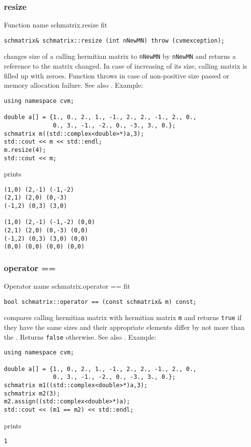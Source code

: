 \subsubsection{resize}
Function%
\pdfdest name {schmatrix.resize} fit
\begin{verbatim}
schmatrix& schmatrix::resize (int nNewMN) throw (cvmexception);
\end{verbatim}
changes  size of a calling hermitian matrix to \verb"nNewMN" by \verb"nNewMN"
and returns a reference to
the matrix changed. In case of increasing of its size, calling matrix
is filled up with zeroes. 
Function throws  
in case of non-positive size passed or memory allocation failure.
See also 
.
Example:
\begin{Verbatim}
using namespace cvm;

double a[] = {1., 0., 2., 1., -1., 2., 2., -1., 2., 0.,
              0., 3., -1., -2., 0., -3., 3., 0.};
schmatrix m((std::complex<double>*)a,3);
std::cout << m << std::endl;
m.resize(4);
std::cout << m;
\end{Verbatim}
prints
\begin{Verbatim}
(1,0) (2,-1) (-1,-2)
(2,1) (2,0) (0,-3)
(-1,2) (0,3) (3,0)

(1,0) (2,-1) (-1,-2) (0,0)
(2,1) (2,0) (0,-3) (0,0)
(-1,2) (0,3) (3,0) (0,0)
(0,0) (0,0) (0,0) (0,0)
\end{Verbatim}
\newpage




\subsubsection{operator ==}
Operator%
\pdfdest name {schmatrix.operator ==} fit
\begin{verbatim}
bool schmatrix::operator == (const schmatrix& m) const;
\end{verbatim}
compares  calling hermitian matrix with  hermitian matrix \verb"m"
and returns \verb"true" if they have the same sizes
and their appropriate elements differ by not more than the
.
Returns \verb"false" otherwise.
See also .
Example:
\begin{Verbatim}
using namespace cvm;

double a[] = {1., 0., 2., 1., -1., 2., 2., -1., 2., 0.,
              0., 3., -1., -2., 0., -3., 3., 0.};
schmatrix m1((std::complex<double>*)a,3);
schmatrix m2(3);
m2.assign((std::complex<double>*)a);
std::cout << (m1 == m2) << std::endl;
\end{Verbatim}
prints
\begin{Verbatim}
1
\end{Verbatim}
\newpage





